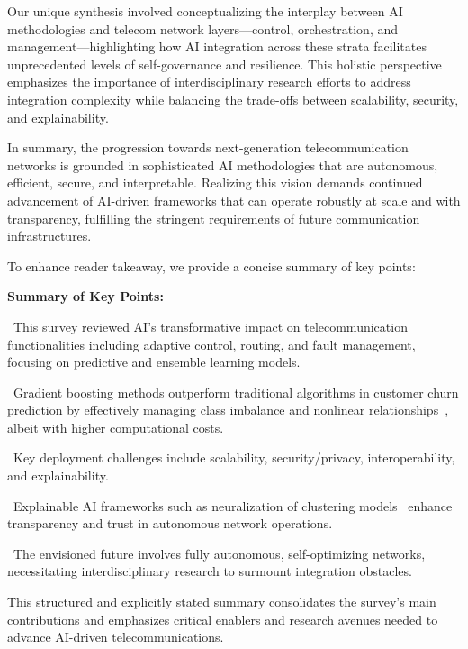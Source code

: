 \documentclass[sigconf]{acmart}
\begin{document}
Our unique synthesis involved conceptualizing the interplay between AI methodologies and telecom network layers—control, orchestration, and management—highlighting how AI integration across these strata facilitates unprecedented levels of self-governance and resilience. This holistic perspective emphasizes the importance of interdisciplinary research efforts to address integration complexity while balancing the trade-offs between scalability, security, and explainability.

In summary, the progression towards next-generation telecommunication networks is grounded in sophisticated AI methodologies that are autonomous, efficient, secure, and interpretable. Realizing this vision demands continued advancement of AI-driven frameworks that can operate robustly at scale and with transparency, fulfilling the stringent requirements of future communication infrastructures.

To enhance reader takeaway, we provide a concise summary of key points:

\textbf{Summary of Key Points:}

\textbullet\ This survey reviewed AI’s transformative impact on telecommunication functionalities including adaptive control, routing, and fault management, focusing on predictive and ensemble learning models.

\textbullet\ Gradient boosting methods outperform traditional algorithms in customer churn prediction by effectively managing class imbalance and nonlinear relationships~\cite{ref17}, albeit with higher computational costs.

\textbullet\ Key deployment challenges include scalability, security/privacy, interoperability, and explainability.

\textbullet\ Explainable AI frameworks such as neuralization of clustering models~\cite{ref45} enhance transparency and trust in autonomous network operations.

\textbullet\ The envisioned future involves fully autonomous, self-optimizing networks, necessitating interdisciplinary research to surmount integration obstacles.

This structured and explicitly stated summary consolidates the survey's main contributions and emphasizes critical enablers and research avenues needed to advance AI-driven telecommunications.



\end{document}
